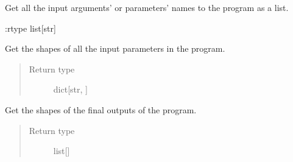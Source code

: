 \documentclass[letterpaper,10pt,english]{sphinxmanual}
\begin{document}

\begin{fulllineitems}
\label{\detokenize{reference/py:migraphx.get_parameter_names}}
\sphinxAtStartPar
Get all the input arguments’ or parameters’ names to the program as a list.

\sphinxAtStartPar
:rtype list{[}str{]}

\end{fulllineitems}


\begin{fulllineitems}
\label{\detokenize{reference/py:migraphx.get_parameter_shapes}}
\sphinxAtStartPar
Get the shapes of all the input parameters in the program.
\begin{quote}\begin{description}
\item[{Return type}] \leavevmode
\sphinxAtStartPar
dict{[}str, {\hyperref[\detokenize{reference/py:migraphx.shape}]{}}{]}

\end{description}\end{quote}

\end{fulllineitems}


\begin{fulllineitems}
\label{\detokenize{reference/py:migraphx.get_output_shapes}}
\sphinxAtStartPar
Get the shapes of the final outputs of the program.
\begin{quote}\begin{description}
\item[{Return type}] \leavevmode
\sphinxAtStartPar
list{[}{\hyperref[\detokenize{reference/py:migraphx.shape}]{}}{]}

\end{description}\end{quote}

\end{fulllineitems}
\end{document}
